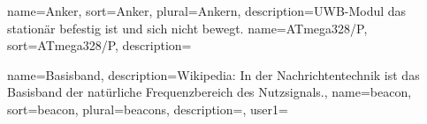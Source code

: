 %
%
%
%


%
%
%



{
	name={Anker}, sort={Anker}, plural={Ankern},
	description={UWB-Modul das stationär befestig ist und sich nicht bewegt.}
}
{
	name={ATmega328/P}, sort={ATmega328/P},
	description={}
}

{
	name={Basisband},
	description={Wikipedia: In der Nachrichtentechnik ist das Basisband der natürliche Frequenzbereich des Nutzsignals.},
}
{
	name={beacon}, sort={beacon}, plural={beacons},
	description={},
	user1={
	}
}




